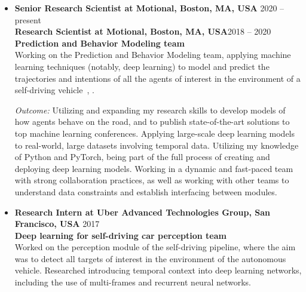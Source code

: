 \documentclass[10pt,letterpaper]{article}
\newcommand{\thing}[2]{{#1} \hfill {#2}}
\begin{document}
\begin{itemize}%

\item \thing{\bf Senior Research Scientist at Motional, Boston, MA, USA}{2020 -- present}\\
 	{\bf Research Scientist at Motional, Boston, MA, USA}\hfill{2018  --  \hspace{2.8mm} 2020}\vspace{0.5em}\\
	{\bf Prediction and Behavior Modeling team}\vspace{0.5em}\\
      	Working on the Prediction and Behavior Modeling team, applying machine learning techniques (notably, deep learning) to model and predict the trajectories and intentions of all the agents of interest in the environment of a self-driving vehicle~\cite{grigore2020covernet}, \cite{grigore2020self_driving_domain_knowledge}.
	
	{\it Outcome:} Utilizing and expanding my research skills to develop models of how agents behave on the road, and to publish state-of-the-art solutions to top machine learning conferences. Applying large-scale deep learning models to real-world, large datasets involving temporal data. Utilizing my knowledge of Python and PyTorch, being part of the full process of creating and deploying deep learning models. Working in a dynamic and fast-paced team with strong collaboration practices, as well as working with other teams to understand data constraints and establish interfacing between modules.
	
\item \thing{\bf Research Intern at Uber Advanced Technologies Group, San Francisco, USA}{2017}\\
        {\bf Deep learning for self-driving car perception team}\vspace{0.5em}\\
        Worked on the perception module of the self-driving pipeline, where the aim was to detect all targets of interest in the environment of the autonomous vehicle. Researched introducing temporal context into deep learning networks, including the use of multi-frames and recurrent neural networks.
	

\end{itemize}
\end{document}
